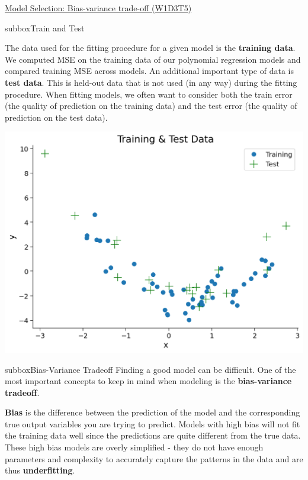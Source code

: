 \begin{textbox}{\href{https://compneuro.neuromatch.io/tutorials/W1D3_ModelFitting/student/W1D3_Tutorial5.html}{Model Selection: Bias-variance trade-off (W1D3T5)}  }
\begin{subbox}{subbox}{Train and Test}
\scriptsize

 The data used for the fitting procedure for a given model is the \textbf{training data}. We computed MSE on the training data of our polynomial regression models and compared training MSE across models. An additional important type of data is \textbf{test data}. This is held-out data that is not used (in any way) during the fitting procedure. When fitting models, we often want to consider both the train error (the quality of prediction on the training data) and the test error (the quality of prediction on the test data).
 
\centering
\includegraphics[scale=0.2]{Figures/ModelFitting/MFFigure5.png}
\end{subbox}
\begin{subbox}{subbox}{Bias-Variance Tradeoff}
\scriptsize
Finding a good model can be difficult. One of the most important concepts to keep in mind when modeling is the \textbf{bias-variance tradeoff}. 

\textbf{Bias} is the difference between the prediction of the model and the corresponding true output variables you are trying to predict. Models with high bias will not fit the training data well since the predictions are quite different from the true data. These high bias models are overly simplified - they do not have enough parameters and complexity to accurately capture the patterns in the data and are thus \textbf{underfitting}.



\end{subbox}
\end{textbox}
